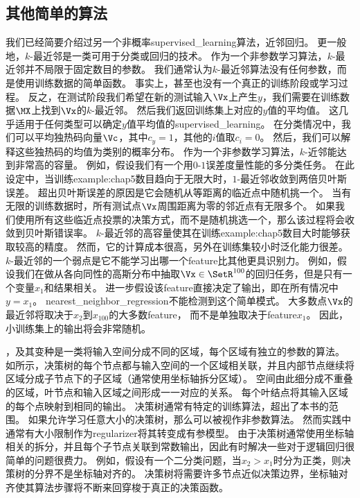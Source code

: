 \subsection{其他简单的算法}
\label{sec:other_simple_supervised_learning_algorithms}
我们已经简要介绍过另一个非概率\gls{supervised_learning}算法，近邻回归。
更一般地，$k$-最近邻是一类可用于分类或回归的技术。
作为一个非参数学习算法，$k$-最近邻并不局限于固定数目的参数。
我们通常认为$k$-最近邻算法没有任何参数，而是使用训练数据的简单函数。
事实上，甚至也没有一个真正的训练阶段或学习过程。
反之，在测试阶段我们希望在新的测试输入$\Vx$上产生$y$，我们需要在训练数据$\MX$上找到$\Vx$的$k$-最近邻。
然后我们返回训练集上对应的$y$值的平均值。
这几乎适用于任何类型可以确定$y$值平均值的\gls{supervised_learning}。
在分类情况中，我们可以平均独热码向量$\Vc$，其中$c_y = 1$，其他的$i$值取$c_i=0$。
然后，我们可以解释这些独热码的均值为类别的概率分布。
作为一个非参数学习算法，$k$-近邻能达到非常高的容量。
例如，假设我们有一个用$0$-$1$误差度量性能的多分类任务。
在此设定中，当训练\gls{example:chap5}数目趋向于无限大时，$1$-最近邻收敛到两倍贝叶斯误差。
超出贝叶斯误差的原因是它会随机从等距离的临近点中随机挑一个。
当有无限的训练数据时，所有测试点$\Vx$周围距离为零的邻近点有无限多个。
如果我们使用所有这些临近点投票的决策方式，而不是随机挑选一个，那么该过程将会收敛到贝叶斯错误率。
$k$-最近邻的高容量使其在训练\gls{example:chap5}数目大时能够获取较高的精度。
然而，它的计算成本很高，另外在训练集较小时泛化能力很差。
$k$-最近邻的一个弱点是它不能学习出哪一个\gls{feature}比其他更具识别力。
例如，假设我们在做从各向同性的高斯分布中抽取$\Vx\in\SetR^{100}$的回归任务，但是只有一个变量$x_1$和结果相关。
进一步假设该\gls{feature}直接决定了输出，即在所有情况中$y=x_1$。
\gls{nearest_neighbor_regression}不能检测到这个简单模式。
大多数点$\Vx$的最近邻将取决于$x_2$到$x_{100}$的大多数\gls{feature}，
而不是单独取决于\gls{feature}$x_1$。
因此，小训练集上的输出将会非常随机。


，及其变种是一类将输入空间分成不同的区域，每个区域有独立的参数的算法\citep{Breiman84}。
如所示，决策树的每个节点都与输入空间的一个区域相关联，并且内部节点继续将区域分成子节点下的子区域（通常使用坐标轴拆分区域）。
空间由此细分成不重叠的区域，叶节点和输入区域之间形成一一对应的关系。
每个叶结点将其输入区域的每个点映射到相同的输出。
决策树通常有特定的训练算法，超出了本书的范围。
如果允许学习任意大小的决策树，那么可以被视作非参数算法。
然而实践中通常有大小限制作为\gls{regularizer}将其转变成有参模型。
由于决策树通常使用坐标轴相关的拆分，并且每个子节点关联到常数输出，因此有时解决一些对于逻辑回归很简单的问题很费力。
例如，假设有一个二分类问题，当$x_2>x_1$时分为正类，则决策树的分界不是坐标轴对齐的。
决策树将需要许多节点近似决策边界，坐标轴对齐使其算法步骤将不断来回穿梭于真正的决策函数。

